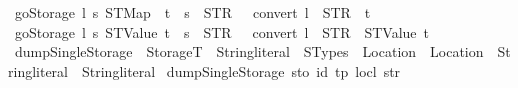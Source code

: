 \begin{isabellebody}
{\isacharbar}{\kern0pt}\ {\isachardoublequoteopen}go\isactrlsub S\isactrlsub t\isactrlsub o\isactrlsub r\isactrlsub a\isactrlsub g\isactrlsub e\ l\ {\isacharparenleft}{\kern0pt}s{\isacharcomma}{\kern0pt}\ STMap\ {\isacharunderscore}{\kern0pt}\ t{\isacharparenright}{\kern0pt}\ {\isacharequal}{\kern0pt}\ {\isacharparenleft}{\kern0pt}s\ {\isacharplus}{\kern0pt}\ {\isacharparenleft}{\kern0pt}STR\ {\isacharprime}{\kern0pt}{\isacharprime}{\kern0pt}{\isacharbrackleft}{\kern0pt}{\isacharprime}{\kern0pt}{\isacharprime}{\kern0pt}{\isacharparenright}{\kern0pt}\ {\isacharplus}{\kern0pt}\ {\isacharparenleft}{\kern0pt}convert\ l{\isacharparenright}{\kern0pt}\ {\isacharplus}{\kern0pt}\ {\isacharparenleft}{\kern0pt}STR\ {\isacharprime}{\kern0pt}{\isacharprime}{\kern0pt}{\isacharbrackright}{\kern0pt}{\isacharprime}{\kern0pt}{\isacharprime}{\kern0pt}{\isacharparenright}{\kern0pt}{\isacharcomma}{\kern0pt}\ t{\isacharparenright}{\kern0pt}{\isachardoublequoteclose}\isanewline
{\isacharbar}{\kern0pt}\ {\isachardoublequoteopen}go\isactrlsub S\isactrlsub t\isactrlsub o\isactrlsub r\isactrlsub a\isactrlsub g\isactrlsub e\ l\ {\isacharparenleft}{\kern0pt}s{\isacharcomma}{\kern0pt}\ STValue\ t{\isacharparenright}{\kern0pt}\ {\isacharequal}{\kern0pt}\ {\isacharparenleft}{\kern0pt}s\ {\isacharplus}{\kern0pt}\ {\isacharparenleft}{\kern0pt}STR\ {\isacharprime}{\kern0pt}{\isacharprime}{\kern0pt}{\isacharbrackleft}{\kern0pt}{\isacharprime}{\kern0pt}{\isacharprime}{\kern0pt}{\isacharparenright}{\kern0pt}\ {\isacharplus}{\kern0pt}\ {\isacharparenleft}{\kern0pt}convert\ l{\isacharparenright}{\kern0pt}\ {\isacharplus}{\kern0pt}\ {\isacharparenleft}{\kern0pt}STR\ {\isacharprime}{\kern0pt}{\isacharprime}{\kern0pt}{\isacharbrackright}{\kern0pt}{\isacharprime}{\kern0pt}{\isacharprime}{\kern0pt}{\isacharparenright}{\kern0pt}{\isacharcomma}{\kern0pt}\ STValue\ t{\isacharparenright}{\kern0pt}{\isachardoublequoteclose}\isanewline
\isanewline
{}\isamarkupfalse%
\ dumpSingle\isactrlsub S\isactrlsub t\isactrlsub o\isactrlsub r\isactrlsub a\isactrlsub g\isactrlsub e\ {\isacharcolon}{\kern0pt}{\isacharcolon}{\kern0pt}\ {\isachardoublequoteopen}StorageT\ {\isasymRightarrow}\ String{\isachardot}{\kern0pt}literal\ {\isasymRightarrow}\ STypes\ {\isasymRightarrow}\ {\isacharparenleft}{\kern0pt}Location\ {\isasymtimes}\ Location{\isacharparenright}{\kern0pt}\ {\isasymRightarrow}\ String{\isachardot}{\kern0pt}literal\ {\isasymRightarrow}\ String{\isachardot}{\kern0pt}literal{\isachardoublequoteclose}\ \isanewline
{\isachardoublequoteopen}dumpSingle\isactrlsub S\isactrlsub t\isactrlsub o\isactrlsub r\isactrlsub a\isactrlsub g\isactrlsub e\ sto\ id{\isacharprime}{\kern0pt}\ tp\ {\isacharparenleft}{\kern0pt}loc{\isacharcomma}{\kern0pt}l{\isacharparenright}{\kern0pt}\ str\ {\isacharequal}{\kern0pt}\isanewline

\end{isabellebody}

